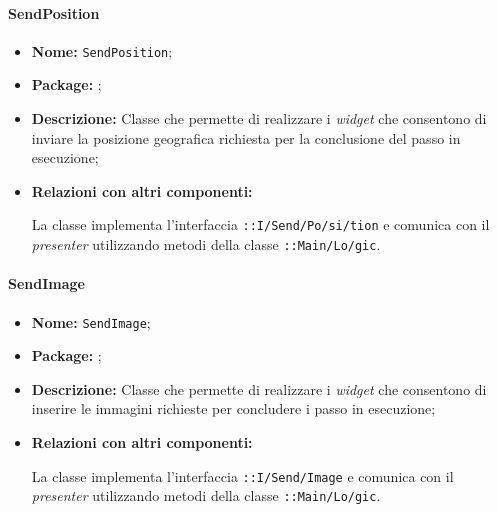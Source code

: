 \paragraph{SendPosition}
\begin{flushleft}
\begin{itemize}
\item \textbf{Nome:} \texttt{SendPosition};
\item \textbf{Package:} \texttt{\viewUser{}};
\item \textbf{Descrizione:} Classe che permette  di realizzare i \textit{widget} che consentono di inviare la posizione geografica richiesta per la conclusione del passo in esecuzione;
\item \textbf{Relazioni con altri componenti:}
\begin{sloppypar}
La classe implementa l'interfaccia \texttt{\iViewUser{}::I\fshyp{}Send\fshyp{}Po\fshyp{}si\fshyp{}tion} e comunica con il \textit{presenter} utilizzando metodi della classe \texttt{\logicUser{}::Main\fshyp{}Lo\fshyp{}gic}.
\end{sloppypar}
\end{itemize}
\end{flushleft}

\paragraph{SendImage}
\begin{flushleft}
\begin{itemize}
\item \textbf{Nome:} \texttt{SendImage};
\item \textbf{Package:} \texttt{\viewUser{}};
\item \textbf{Descrizione:} Classe che permette di realizzare i \textit{widget} che consentono di inserire le immagini richieste per concludere i passo in esecuzione;
\item \textbf{Relazioni con altri componenti:}
\begin{sloppypar}
La classe implementa l'interfaccia \texttt{\iViewUser{}::I\fshyp{}Send\fshyp{}Image} e comunica con il \textit{presenter} utilizzando metodi della classe \texttt{\logicUser{}::Main\fshyp{}Lo\fshyp{}gic}.
\end{sloppypar}
\end{itemize}
\end{flushleft}

